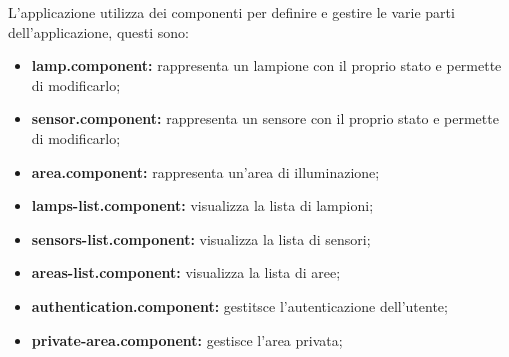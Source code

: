 L'applicazione utilizza dei componenti per definire e gestire le varie parti dell'applicazione, questi sono:
\begin{itemize}
    \item \textbf{lamp.component:} rappresenta un lampione con il proprio stato e permette di modificarlo;
    \item \textbf{sensor.component:} rappresenta un sensore con il proprio stato e permette di modificarlo;
    \item \textbf{area.component:} rappresenta un'area di illuminazione;
    \item \textbf{lamps-list.component:} visualizza la lista di lampioni;
    \item \textbf{sensors-list.component:} visualizza la lista di sensori;
    \item \textbf{areas-list.component:} visualizza la lista di aree;
    \item \textbf{authentication.component:} gestitsce l'autenticazione dell'utente;
    \item \textbf{private-area.component:} gestisce l'area privata;
\end{itemize}